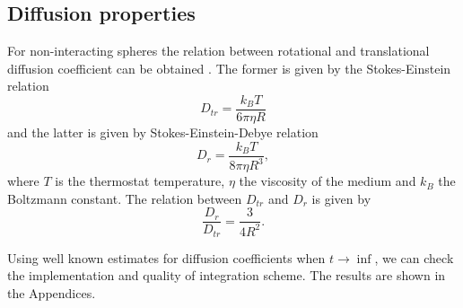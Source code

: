 \subsection{Diffusion properties}
For non-interacting spheres the relation between rotational and translational diffusion coefficient can be obtained \cite{C5SM02754C}. The former is given by the Stokes-Einstein relation
\begin{equation}
\label{eq:translational_diffusion_coefficient}
	D_{tr} = \frac{k_B T}{6 \pi \eta R}
\end{equation}
and the latter is given by Stokes-Einstein-Debye relation
\begin{equation}
\label{eq:rotational_diffusion_coefficient}
	D_r = \frac{k_B T}{8 \pi \eta R^3}
	,
\end{equation}
where $T$ is the thermostat temperature, $\eta$ the viscosity of the medium and $k_B$ the Boltzmann constant. The relation between $D_{tr}$ and $D_r$ is given by
\begin{equation}
	\frac{D_r}{D_{tr}} = \frac{3}{4 R^2}
	.
\end{equation}

Using well known estimates for diffusion coefficients when $t \rightarrow \inf$, we can check the implementation and quality of integration scheme. The results are shown in the Appendices.
